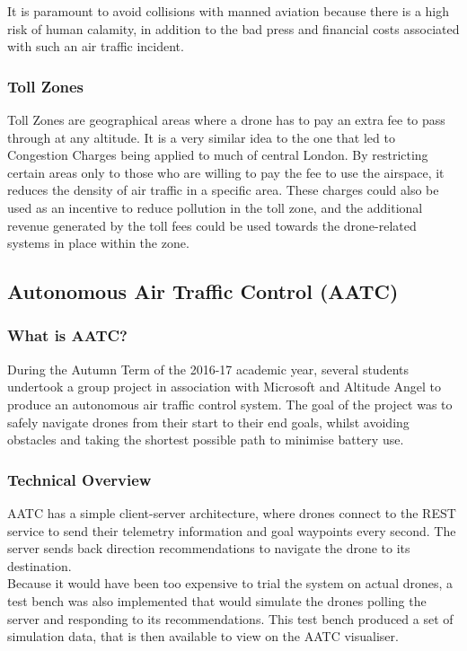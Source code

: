 \documentclass[a4paper,12pt,titlepage]{article}
\begin{document}
It is paramount to avoid collisions with manned aviation because there is a high risk of human calamity, in addition to the bad press and financial costs associated with such an air traffic incident.

\subsubsection{Toll Zones}
Toll Zones are geographical areas where a drone has to pay an extra fee to pass through at any altitude. It is a very similar idea to the one that led to Congestion Charges being applied to much of central London. By restricting certain areas only to those who are willing to pay the fee to use the airspace, it reduces the density of air traffic in a specific area. These charges could also be used as an incentive to reduce pollution in the toll zone, and the additional revenue generated by the toll fees could be used towards the drone-related systems in place within the zone.

\subsection{Autonomous Air Traffic Control (AATC)}
\subsubsection{What is AATC?}
During the Autumn Term of the 2016-17 academic year, several students undertook a group project in association with Microsoft and Altitude Angel to produce an autonomous air traffic control system. The goal of the project was to safely navigate drones from their start to their end goals, whilst avoiding obstacles and taking the shortest possible path to minimise battery use.

\subsubsection{Technical Overview}
AATC has a simple client-server architecture, where drones connect to the REST service to send their telemetry information and goal waypoints every second. The server sends back direction recommendations to navigate the drone to its destination. \\

Because it would have been too expensive to trial the system on actual drones, a test bench was also implemented that would simulate the drones polling the server and responding to its recommendations. This test bench produced a set of simulation data, that is then available to view on the AATC visualiser. \cite{Balaji2017a}
\end{document}
